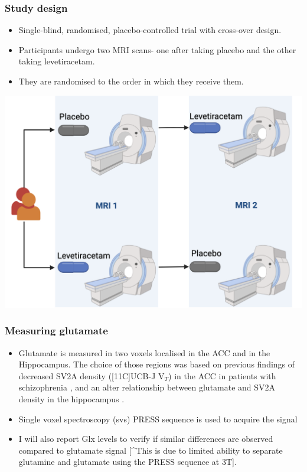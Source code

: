 \documentclass[
  letterpaper,
  DIV=11,
  numbers=noendperiod]{scrartcl}
\providecommand{\tightlist}{%
  \setlength{\itemsep}{0pt}\setlength{\parskip}{0pt}}\usepackage{longtable,booktabs,array}
\begin{document}
\subsubsection{Study design}\label{study-design}

\begin{itemize}
\tightlist
\item
  Single-blind, randomised, placebo-controlled trial with cross-over
  design.
\item
  Participants undergo two MRI scans- one after taking placebo and the
  other taking levetiracetam.
\item
  They are randomised to the order in which they receive them.
\end{itemize}

\begin{center}
\includegraphics{files/study_design.png}
\end{center}

\subsubsection{Measuring glutamate}\label{measuring-glutamate}

\begin{itemize}
\tightlist
\item
  Glutamate is measured in two voxels localised in the ACC and in the
  Hippocampus. The choice of those regions was based on previous
  findings of decreased SV2A density ({[}11C{]}UCB-J V\(_T\)) in the ACC
  in patients with schizophrenia \autocite{onwordi_synaptic_2020}, and
  an alter relationship between glutamate and SV2A density in the
  hippocampus \autocite{onwordi_relationship_2021}.
\item
  Single voxel spectroscopy (svs) PRESS sequence is used to acquire the
  signal
\item
  I will also report Glx levels to verify if similar differences are
  observed compared to glutamate signal {[}\^{}This is due to limited
  ability to separate glutamine and glutamate using the PRESS sequence
  at 3T{]}.
\end{itemize}
\end{document}
